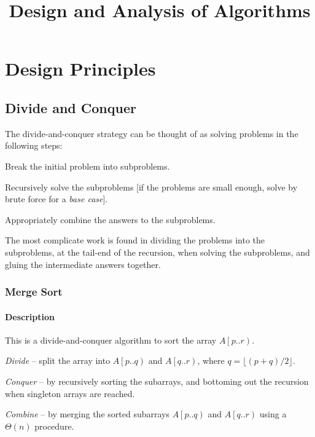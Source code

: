 \documentclass[10pt]{article}
\title{Design and Analysis of Algorithms}
\author{}\date{}
\begin{document}
\twocolumn
\maketitle
\tableofcontents
\listofalgorithms
\section{Design Principles}
\subsection{Divide and Conquer}
The divide-and-conquer strategy can be thought of as solving problems in the following steps:
\begin{enumerate*}
\item Break the initial problem into subproblems.
\item Recursively solve the subproblems [if the problems are small enough, solve by brute force for a \emph{base case}].
\item Appropriately combine the answers to the subproblems.
\end{enumerate*}
The most complicate work is found in dividing the problems into the subproblems, at the tail-end of the recursion, when solving the subproblems, and gluing the intermediate answers together.
\subsubsection{Merge Sort}
\paragraph{Description}
This is a divide-and-conquer algorithm to sort the array $A\left[p..r\right)$.
\begin{enumerate*}
\item \emph{Divide} -- split the array into $A\left[p..q\right)$ and $A\left[q..r\right)$, where $q=\lfloor(p+q)/2\rfloor$.
\item \emph{Conquer} -- by recursively sorting the subarrays, and bottoming out the recursion when singleton arrays are reached.
\item \emph{Combine} -- by merging the sorted subarrays $A\left[p..q\right)$ and $A\left[q..r\right)$ using a $\Theta(n)$ procedure.
\end{enumerate*}
\end{document}
